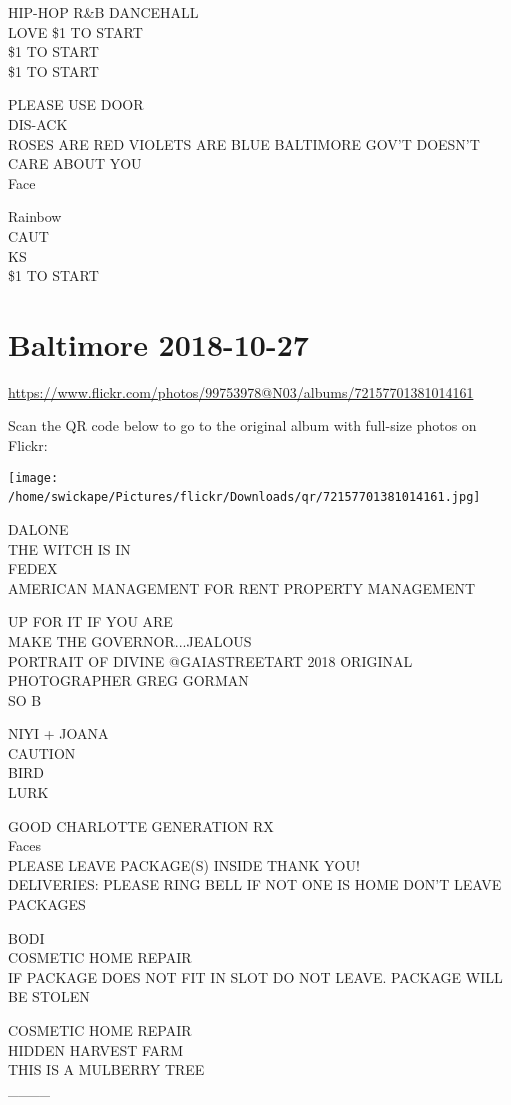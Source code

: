 \documentclass[10pt,letterpaper]{article}
\begin{document}
HIP{-}HOP R\&B DANCEHALL\\
LOVE \$1 TO START\\
\$1 TO START\\
\$1 TO START

PLEASE USE DOOR\\
DIS{-}ACK\\
ROSES ARE RED VIOLETS ARE BLUE BALTIMORE GOV'T DOESN'T CARE ABOUT YOU\\
Face

Rainbow\\
CAUT\\
KS\\
\$1 TO START
\

\section*{Baltimore 2018-10-27}

\url{https://www.flickr.com/photos/99753978@N03/albums/72157701381014161}

Scan the QR code below to go to the original album with full-size photos on Flickr:

\texttt{[image: /home/swickape/Pictures/flickr/Downloads/qr/72157701381014161.jpg]}
\

DALONE\\
THE WITCH IS IN\\
FEDEX\\
AMERICAN MANAGEMENT FOR RENT PROPERTY MANAGEMENT

UP FOR IT IF YOU ARE\\
MAKE THE GOVERNOR...JEALOUS\\
PORTRAIT OF DIVINE @GAIASTREETART 2018 ORIGINAL PHOTOGRAPHER GREG GORMAN\\
SO B

NIYI + JOANA\\
CAUTION\\
BIRD\\
LURK

GOOD CHARLOTTE GENERATION RX\\
Faces\\
PLEASE LEAVE PACKAGE(S) INSIDE THANK YOU!\\
DELIVERIES: PLEASE RING BELL IF NOT ONE IS HOME DON'T LEAVE PACKAGES

BODI\\
COSMETIC HOME REPAIR\\
IF PACKAGE DOES NOT FIT IN SLOT DO NOT LEAVE.  PACKAGE WILL BE STOLEN

COSMETIC HOME REPAIR\\
HIDDEN HARVEST FARM\\
THIS IS A MULBERRY TREE\\
\_\_\_\_
\end{document}
